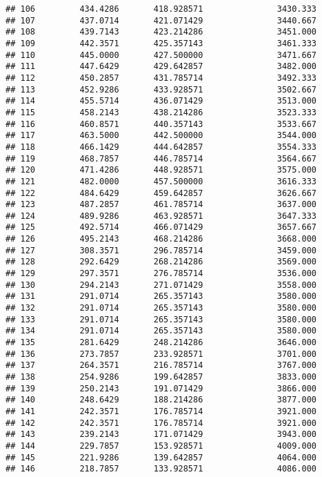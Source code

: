 \documentclass[]{article}
\begin{document}
\begin{verbatim}
## 106         434.4286       418.928571               3430.333
## 107         437.0714       421.071429               3440.667
## 108         439.7143       423.214286               3451.000
## 109         442.3571       425.357143               3461.333
## 110         445.0000       427.500000               3471.667
## 111         447.6429       429.642857               3482.000
## 112         450.2857       431.785714               3492.333
## 113         452.9286       433.928571               3502.667
## 114         455.5714       436.071429               3513.000
## 115         458.2143       438.214286               3523.333
## 116         460.8571       440.357143               3533.667
## 117         463.5000       442.500000               3544.000
## 118         466.1429       444.642857               3554.333
## 119         468.7857       446.785714               3564.667
## 120         471.4286       448.928571               3575.000
## 121         482.0000       457.500000               3616.333
## 122         484.6429       459.642857               3626.667
## 123         487.2857       461.785714               3637.000
## 124         489.9286       463.928571               3647.333
## 125         492.5714       466.071429               3657.667
## 126         495.2143       468.214286               3668.000
## 127         308.3571       296.785714               3459.000
## 128         292.6429       268.214286               3569.000
## 129         297.3571       276.785714               3536.000
## 130         294.2143       271.071429               3558.000
## 131         291.0714       265.357143               3580.000
## 132         291.0714       265.357143               3580.000
## 133         291.0714       265.357143               3580.000
## 134         291.0714       265.357143               3580.000
## 135         281.6429       248.214286               3646.000
## 136         273.7857       233.928571               3701.000
## 137         264.3571       216.785714               3767.000
## 138         254.9286       199.642857               3833.000
## 139         250.2143       191.071429               3866.000
## 140         248.6429       188.214286               3877.000
## 141         242.3571       176.785714               3921.000
## 142         242.3571       176.785714               3921.000
## 143         239.2143       171.071429               3943.000
## 144         229.7857       153.928571               4009.000
## 145         221.9286       139.642857               4064.000
## 146         218.7857       133.928571               4086.000

\end{verbatim}
\end{document}
